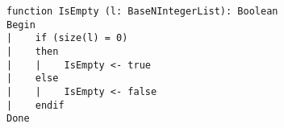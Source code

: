 \begin{lstlisting}[breaklines]
function IsEmpty (l: BaseNIntegerList): Boolean
Begin
|    if (size(l) = 0)
|    then
|    |    IsEmpty <- true
|    else
|    |    IsEmpty <- false
|    endif
Done
\end{lstlisting}
